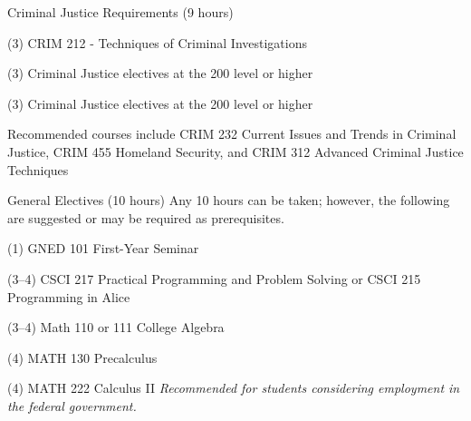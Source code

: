 \begin{reqgroup}{Criminal Justice Requirements (9 hours)}
\begin{checklist}
\begin{minipage}[t]{0.5\linewidth}
	\item (3) CRIM 212 - Techniques of Criminal Investigations
\end{minipage}
\begin{minipage}[t]{0.5\linewidth}
	\item (3) Criminal Justice electives at the 200 level or higher
	\item (3) Criminal Justice electives at the 200 level or higher
\end{minipage}
\end{checklist}
Recommended courses include CRIM 232 Current Issues and Trends in Criminal Justice,
CRIM 455 Homeland Security, and CRIM 312 Advanced Criminal Justice Techniques
\end{reqgroup}

\begin{reqgroup}{General Electives (10 hours)}
Any 10 hours can be taken; however, the following are suggested or may be required as prerequisites.
\begin{checklist}
\begin{minipage}[t]{\linewidth}
	\item (1)	GNED 101	First-Year Seminar
	\item (3--4)	CSCI 217	Practical Programming and Problem Solving or CSCI 215	Programming in Alice
	\item (3--4) Math 110 or 111 College Algebra
	\item (4) MATH 130 Precalculus
	\item (4) MATH 222 Calculus II \em{Recommended for students considering employment in the federal government.}
\end{minipage}
\end{checklist}
\end{reqgroup}

